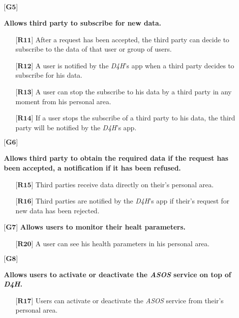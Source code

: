 \begin{itemize}
	\item[${\textbf{[G5]}}$] {\textbf{Allows third party to subscribe for new data.}
		\begin{itemize}
			\item[$\textbf{[R11]}$] {After a request has been accepted, the third party can decide to subscribe to the data of that user or group of users.}
			\item[$\textbf{[R12]}$] {A user is notified by the \hbox{\emph{D4H}}'s app when a third party decides to subscribe for his data.}
			\item[$\textbf{[R13]}$] {A user can stop the subscribe to his data by a third party in any moment from his personal area.}
			\item[$\textbf{[R14]}$] {If a user stops the subscribe of a third party to his data, the third party will be notified by the \hbox{\emph{D4H}}'s app.}
		\end{itemize}}


	\item[${\textbf{[G6]}}$] {\textbf{Allows third party to obtain the required data if the request has been accepted, a notification if it has been refused.}
		\begin{itemize}
			\item[$\textbf{[R15]}$] {Third parties receive data directly on their's personal area.}
			\item[$\textbf{[R16]}$] {Third parties are notified by the \hbox{\emph{D4H}}'s app if their's request for new data has been rejected.}
		\end{itemize}}

	\item[${\textbf{[G7]}}$] {\textbf{Allows users to monitor their healt parameters.}}
		\begin{itemize}
			\item[$\textbf{[R20]}$] {A user can see his health parameters in his personal area.}
		\end{itemize}

	\item[${\textbf{[G8]}}$] {\textbf{Allows users to activate or deactivate the \hbox{\emph{ASOS}} service on top of \hbox{\emph{D4H}}.}
		\begin{itemize}
			\item[$\textbf{[R17]}$] {Users can activate or deactivate the \hbox{\emph{ASOS}} service from their's personal area.}
		\end{itemize}}



\end{itemize}
